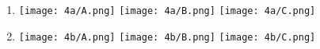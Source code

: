 \begin{question}
    
    \begin{enumerate}[label=\textbf{\alph*})]
        \item 
        \begin{minipage}{\linewidth}
            \centering
            \texttt{[image: 4a/A.png]}
            \hspace*{1cm}
            \texttt{[image: 4a/B.png]}
            \hspace*{1cm}
            \texttt{[image: 4a/C.png]}
        \end{minipage}

        \item 
        \begin{minipage}{\linewidth}
            \centering
            \texttt{[image: 4b/A.png]}
            \hspace*{1cm}
            \texttt{[image: 4b/B.png]}
            \hspace*{1cm}
            \texttt{[image: 4b/C.png]}
        \end{minipage}

    \end{enumerate}
\end{question}